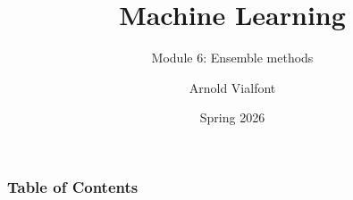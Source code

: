 
\title{Machine Learning}
\subtitle{Module 6: Ensemble methods}
\author[A. Vialfont]{Arnold Vialfont}
\date{Spring 2026}

\begin{frame}
  \titlepage
\end{frame}
\begin{frame}
\frametitle{Table of Contents}
	\tableofcontents
\end{frame}
